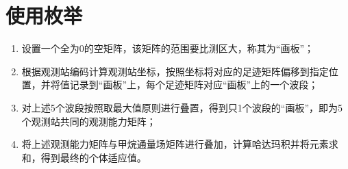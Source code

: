 
\section{使用枚举}

\begin{enumerate}[itemsep=2pt,topsep=0pt,parsep=0pt]
    \item 设置一个全为0的空矩阵，该矩阵的范围要比测区大，称其为“画板”；
    \item 根据观测站编码计算观测站坐标，按照坐标将对应的足迹矩阵偏移到指定位置，并将值记录到“画板”上，每个足迹矩阵对应“画板”上的一个波段；
    \item 对上述5个波段按照取最大值原则进行叠置，得到只1个波段的“画板”，即为5个观测站共同的观测能力矩阵；
    \item 将上述观测能力矩阵与甲烷通量场矩阵进行叠加，计算哈达玛积并将元素求和，得到最终的个体适应值。
\end{enumerate}
